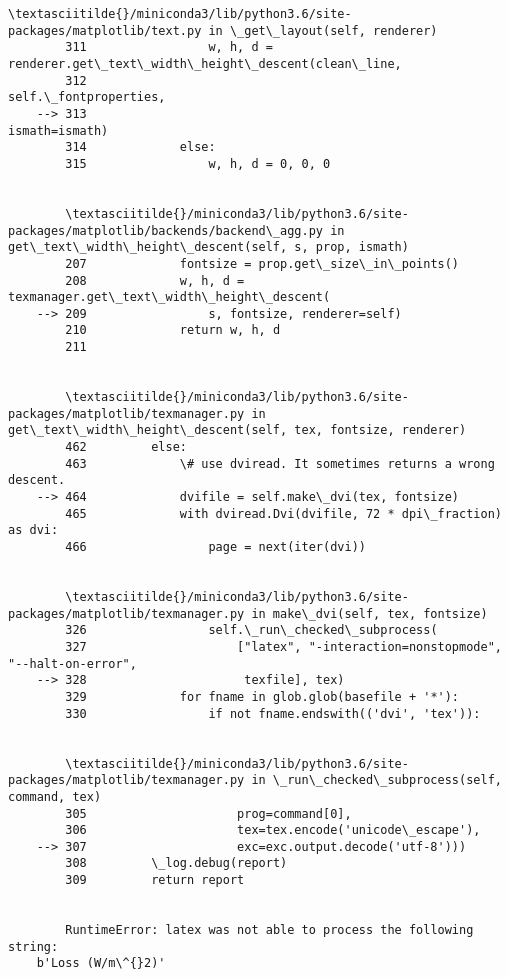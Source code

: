 \documentclass[11pt]{article}
\begin{document}
\begin{Verbatim}[commandchars=\\\{\}]
        \textasciitilde{}/miniconda3/lib/python3.6/site-packages/matplotlib/text.py in \_get\_layout(self, renderer)
        311                 w, h, d = renderer.get\_text\_width\_height\_descent(clean\_line,
        312                                                         self.\_fontproperties,
    --> 313                                                         ismath=ismath)
        314             else:
        315                 w, h, d = 0, 0, 0


        \textasciitilde{}/miniconda3/lib/python3.6/site-packages/matplotlib/backends/backend\_agg.py in get\_text\_width\_height\_descent(self, s, prop, ismath)
        207             fontsize = prop.get\_size\_in\_points()
        208             w, h, d = texmanager.get\_text\_width\_height\_descent(
    --> 209                 s, fontsize, renderer=self)
        210             return w, h, d
        211 


        \textasciitilde{}/miniconda3/lib/python3.6/site-packages/matplotlib/texmanager.py in get\_text\_width\_height\_descent(self, tex, fontsize, renderer)
        462         else:
        463             \# use dviread. It sometimes returns a wrong descent.
    --> 464             dvifile = self.make\_dvi(tex, fontsize)
        465             with dviread.Dvi(dvifile, 72 * dpi\_fraction) as dvi:
        466                 page = next(iter(dvi))


        \textasciitilde{}/miniconda3/lib/python3.6/site-packages/matplotlib/texmanager.py in make\_dvi(self, tex, fontsize)
        326                 self.\_run\_checked\_subprocess(
        327                     ["latex", "-interaction=nonstopmode", "--halt-on-error",
    --> 328                      texfile], tex)
        329             for fname in glob.glob(basefile + '*'):
        330                 if not fname.endswith(('dvi', 'tex')):


        \textasciitilde{}/miniconda3/lib/python3.6/site-packages/matplotlib/texmanager.py in \_run\_checked\_subprocess(self, command, tex)
        305                     prog=command[0],
        306                     tex=tex.encode('unicode\_escape'),
    --> 307                     exc=exc.output.decode('utf-8')))
        308         \_log.debug(report)
        309         return report


        RuntimeError: latex was not able to process the following string:
    b'Loss (W/m\^{}2)'
    

\end{Verbatim}
\end{document}
